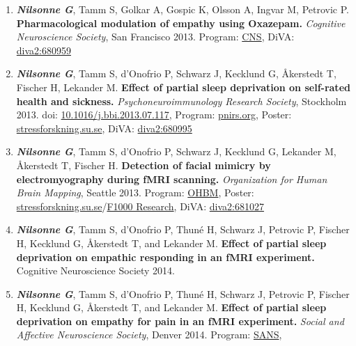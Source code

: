 \documentclass[10pt]{article}
\begin{document}
\begin{enumerate}[nolistsep]
\item \textbf{\textit{Nilsonne G}}, Tamm S, Golkar A, Gospic K, Olsson A, Ingvar M, Petrovic P. \textbf{Pharmacological modulation of empathy using Oxazepam.} \emph{Cognitive Neuroscience Society}, San Francisco 2013.
Program: \href{http://www.cogneurosociety.org/wordpress2015/wp-content/uploads/2013/04/CNS2013_Program.pdf}{CNS}, DiVA: \href{http://www.diva-portal.org/smash/record.jsf?pid=diva2\%3A680959\&dswid=-3675}{diva2:680959}
\item \textbf{\textit{Nilsonne G}}, Tamm S, d’Onofrio P, Schwarz J, Kecklund G, Åkerstedt T, Fischer H, Lekander M. \textbf{Effect of partial sleep deprivation on self-rated health and sickness.} \emph{Psychoneuroimmunology Research Society}, Stockholm 2013.
doi: \href{http://dx.doi.org/10.1016/j.bbi.2013.07.117}{10.1016/j.bbi.2013.07.117}, 
Program: \href{https://www.pnirs.org/resources/docs/Program\%20Booklet\%202013.pdf}{pnirs.org}, 
Poster: \href{http://www.stressforskning.su.se/polopoly_fs/1.238751.1433422633!/menu/standard/file/PNIRS\%20Gustav\%20Nilsonne.pdf}{stressforskning.su.se},
DiVA: \href{http://www.diva-portal.org/smash/record.jsf?pid=diva2\%3A680995\&dswid=-8008}{diva2:680995}
\item \textbf{\textit{Nilsonne G}}, Tamm S, d’Onofrio P, Schwarz J, Kecklund G, Lekander M, Åkerstedt T, Fischer H. \textbf{Detection of facial mimicry by electromyography during fMRI scanning.} \emph{Organization for Human Brain Mapping}, Seattle 2013.
Program: \href{http://www.humanbrainmapping.org/files/2013MeetingFiles/OHBM_2013_Program_Book.pdf}{OHBM}, 
Poster: \href{http://www.stressforskning.su.se/polopoly_fs/1.238727.1433421471!/menu/standard/file/Gustav\%203.pdf}{stressforskning.su.se}/\href{http://f1000.com/posters/browse/summary/1093587}{F1000 Research}, 
DiVA: \href{http://www.diva-portal.org/smash/record.jsf?pid=diva2\%3A681027\&dswid=9867}{diva2:681027}
\item \textbf{\textit{Nilsonne G}}, Tamm S, d’Onofrio P, Thuné H, Schwarz J, Petrovic P, Fischer H, Kecklund G, Åkerstedt T, and Lekander M. \textbf{Effect of partial sleep deprivation on empathic responding in an fMRI experiment.} Cognitive Neuroscience Society 2014.
\item \textbf{\textit{Nilsonne G}}, Tamm S, d’Onofrio P, Thuné H, Schwarz J, Petrovic P, Fischer H, Kecklund G, Åkerstedt T, and Lekander M. \textbf{Effect of partial sleep deprivation on empathy for pain in an fMRI experiment.} \emph{Social and Affective Neuroscience Society}, Denver 2014.
Program: \href{http://www.socialaffectiveneuro.org/documents/SANS_program_2014.pdf}{SANS}, 

\end{enumerate}
\end{document}
